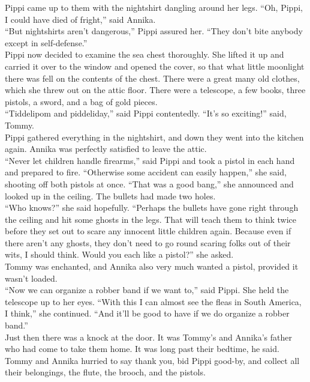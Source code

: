 \documentclass{standard}
\begin{document}
Pippi came up to them with the nightshirt dangling around her legs. “Oh, Pippi, I could have died of fright,” said Annika.\\

“But nightshirts aren’t dangerous,” Pippi assured her. “They don’t bite anybody except in self-defense.”\\

Pippi now decided to examine the sea chest thoroughly. She lifted it up and carried it over to the window and opened the cover, so that what little moonlight there was fell on the contents of the chest. There were a great many old clothes, which she threw out on the attic floor. There were a telescope, a few books, three pistols, a sword, and a bag of gold pieces.\\

“Tiddelipom and piddeliday,” said Pippi contentedly. “It’s so exciting!” said, Tommy.\\

Pippi gathered everything in the nightshirt, and down they went into the kitchen again. Annika was perfectly satisfied to leave the attic.\\

“Never let children handle firearms,” said Pippi and took a pistol in each hand and prepared to fire. “Otherwise some accident can easily happen,” she said, shooting off both pistols at once. “That was a good bang,” she announced and looked up in the ceiling. The bullets had made two holes.\\

“Who knows?” she said hopefully. “Perhaps the bullets have gone right through the ceiling and hit some ghosts in the legs. That will teach them to think twice before they set out to scare any innocent little children again. Because even if there aren’t any ghosts, they don’t need to go round scaring folks out of their wits, I should think. Would you each like a pistol?” she asked.\\

Tommy was enchanted, and Annika also very much wanted a pistol, provided it wasn’t loaded.\\

“Now we can organize a robber band if we want to,” said Pippi. She held the telescope up to her eyes. “With this I can almost see the fleas in South America, I think,” she continued. “And it’ll be good to have if we do organize a robber band.”\\

Just then there was a knock at the door. It was Tommy’s and Annika’s father who had come to take them home. It was long past their bedtime, he said. Tommy and Annika hurried to say thank you, bid Pippi good-by, and collect all their belongings, the flute, the brooch, and the pistols.\\
\end{document}
